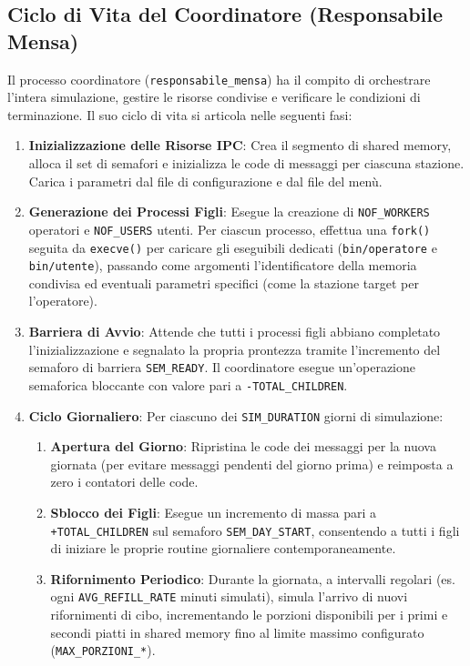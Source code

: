 \documentclass[a4paper,12pt]{article}
\begin{document}
\subsection{Ciclo di Vita del Coordinatore (Responsabile Mensa)}

Il processo coordinatore (\texttt{responsabile\_mensa}) ha il compito di orchestrare l'intera simulazione, gestire le risorse condivise e verificare le condizioni di terminazione. Il suo ciclo di vita si articola nelle seguenti fasi:

\begin{enumerate}
  \item \textbf{Inizializzazione delle Risorse IPC}: Crea il segmento di shared memory, alloca il set di semafori e inizializza le code di messaggi per ciascuna stazione. Carica i parametri dal file di configurazione e dal file del menù.
  \item \textbf{Generazione dei Processi Figli}: Esegue la creazione di \texttt{NOF\_WORKERS} operatori e \texttt{NOF\_USERS} utenti. Per ciascun processo, effettua una \texttt{fork()} seguita da \texttt{execve()} per caricare gli eseguibili dedicati (\texttt{bin/operatore} e \texttt{bin/utente}), passando come argomenti l'identificatore della memoria condivisa ed eventuali parametri specifici (come la stazione target per l'operatore).
  \item \textbf{Barriera di Avvio}: Attende che tutti i processi figli abbiano completato l'inizializzazione e segnalato la propria prontezza tramite l'incremento del semaforo di barriera \texttt{SEM\_READY}. Il coordinatore esegue un'operazione semaforica bloccante con valore pari a \texttt{-TOTAL\_CHILDREN}.
  \item \textbf{Ciclo Giornaliero}: Per ciascuno dei \texttt{SIM\_DURATION} giorni di simulazione:
    \begin{enumerate}[label=\alph*)]
      \item \textbf{Apertura del Giorno}: Ripristina le code dei messaggi per la nuova giornata (per evitare messaggi pendenti del giorno prima) e reimposta a zero i contatori delle code.
      \item \textbf{Sblocco dei Figli}: Esegue un incremento di massa pari a \texttt{+TOTAL\_CHILDREN} sul semaforo \texttt{SEM\_DAY\_START}, consentendo a tutti i figli di iniziare le proprie routine giornaliere contemporaneamente.
      \item \textbf{Rifornimento Periodico}: Durante la giornata, a intervalli regolari (es. ogni \texttt{AVG\_REFILL\_RATE} minuti simulati), simula l'arrivo di nuovi rifornimenti di cibo, incrementando le porzioni disponibili per i primi e secondi piatti in shared memory fino al limite massimo configurato (\texttt{MAX\_PORZIONI\_*}).

\end{enumerate}
\end{enumerate}
\end{document}

